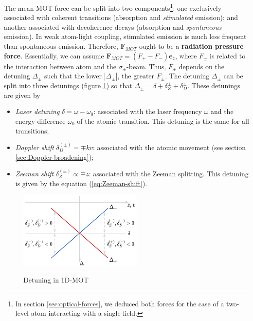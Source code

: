 The mean MOT force can be split into two components\footnote{In section \ref{sec:optical-forces}, we deduced both forces for the case of a two-level atom interacting with a single field.}: one exclusively associated with coherent transitions (absorption and \textit{stimulated} emission); and another associated with decoherence decays (absorption and \textit{spontaneous} emission). In weak atom-light coupling, stimulated emission is much less frequent than spontaneous emission. Therefore, $ \mathbf{F}_{MOT} $ ought to be a \textbf{radiation pressure force}. Essentially, we can assume $ \mathbf{F}_{MOT} = (F_{+} - F_{-}) \mathbf{e}_z $, where $ F_{\pm} $ is related to the interaction between atom and the $ \sigma_{\pm} $-beam. Thus, $ F_{\pm} $ depends on the detuning $ \Delta_{\pm} $ such that the lower $ |\Delta_{\pm}| $, the greater $ F_{\pm} $. The detuning $ \Delta_{\pm} $ can be split into three detunings (figure \ref{fig:detuning-1D-MOT}) so that $ \Delta_{\pm} = \delta + \delta_Z^{\pm} + \delta_D^{\pm} $. These detunings are given by
\begin{itemize}
	\item \textit{Laser detuning} $ \delta = \omega - \omega_0 $: associated with the laser frequency $ \omega $ and the energy difference $ \omega_0 $ of the atomic transition. This detuning is the same for all transitions;

	\item \textit{Doppler shift} $ \delta_{D}^{(\pm)} = \mp k v $: associated with the atomic movement (see section \ref{sec:Doppler-broadening});

	\item \textit{Zeeman shift} $ \delta_Z^{(\pm)} \propto \mp z $: associated with the Zeeman splitting. This detuning is given by the equation (\ref{eq:Zeeman-shift}).
\end{itemize}

\begin{figure}[!ht]
	\centering
	\caption{Detuning in 1D-MOT}
	\includegraphics[width=0.55\textwidth]{USPSC-img/1D-MOT-detunings.png}
	\vspace{5pt}
	\label{fig:detuning-1D-MOT}
	\vspace{-20pt}
\end{figure}

